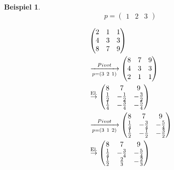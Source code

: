 \documentclass[a4paper,10pt]{scrartcl}
\newtheorem[L]{satz}{Satz}[section]
\newtheorem{bsp}{Beispiel}[section]
\newtheorem[S]{beweis}{Beweis}
\newtheorem[S]{beh}{Behauptung}
\begin{document}
\begin{bsp}
  \[
    p = \begin{pmatrix} 1 & 2 & 3 \end{pmatrix}
  \]

  \begin{align*}
    &\begin{pmatrix}
       2 & 1 & 1 \\
       4 & 3 & 3 \\
       8 & 7 & 9
    \end{pmatrix} \\
  &\xrightarrow[p=(3\ 2\ 1)]{Pivot}
    \begin{pmatrix}
       8 & 7 & 9 \\
       4 & 3 & 3 \\
       2 & 1 & 1
    \end{pmatrix} \\
  &\stackrel{\textnormal{El.}}{\rightarrow}
    \begin{pmatrix}
       8 & 7 & 9 \\
       \frac{1}{2} & -\frac{1}{2} & -\frac{3}{2} \\
       \frac{1}{4} & -\frac{3}{4} & -\frac{5}{4}
    \end{pmatrix} \\
  &\xrightarrow[p=(3\ 1\ 2)]{Pivot}
    \begin{pmatrix}
       8 & 7 & 9 \\
       \frac{1}{4} & -\frac{3}{4} & -\frac{5}{4} \\
       \frac{1}{2} & -\frac{1}{2} & -\frac{3}{2}
    \end{pmatrix} \\
  &\stackrel{\textnormal{El.}}{\rightarrow}
    \begin{pmatrix}
       8 & 7 & 9 \\
       \frac{1}{4} & -\frac{3}{4} & -\frac{5}{4} \\
       \frac{1}{2} & \frac{2}{3} & -\frac{2}{3}
    \end{pmatrix}\\
  \end{align*}


\end{bsp}
\end{document}
